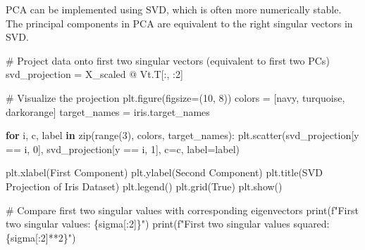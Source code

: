 \documentclass[
  letterpaper,
  DIV=11,
  numbers=noendperiod]{scrreprt}
\newenvironment{Shaded}{\begin{snugshade}}{\end{snugshade}}
\newcommand{\BuiltInTok}[1]{\textcolor[rgb]{0.00,0.23,0.31}{#1}}
\newcommand{\CommentTok}[1]{\textcolor[rgb]{0.37,0.37,0.37}{#1}}
\newcommand{\ControlFlowTok}[1]{\textcolor[rgb]{0.00,0.23,0.31}{\textbf{#1}}}
\newcommand{\DecValTok}[1]{\textcolor[rgb]{0.68,0.00,0.00}{#1}}
\newcommand{\KeywordTok}[1]{\textcolor[rgb]{0.00,0.23,0.31}{\textbf{#1}}}
\newcommand{\NormalTok}[1]{\textcolor[rgb]{0.00,0.23,0.31}{#1}}
\newcommand{\OperatorTok}[1]{\textcolor[rgb]{0.37,0.37,0.37}{#1}}
\newcommand{\SpecialCharTok}[1]{\textcolor[rgb]{0.37,0.37,0.37}{#1}}
\newcommand{\SpecialStringTok}[1]{\textcolor[rgb]{0.13,0.47,0.30}{#1}}
\newcommand{\StringTok}[1]{\textcolor[rgb]{0.13,0.47,0.30}{#1}}
\newcommand{\VariableTok}[1]{\textcolor[rgb]{0.07,0.07,0.07}{#1}}
\begin{document}
PCA can be implemented using SVD, which is often more numerically
stable. The principal components in PCA are equivalent to the right
singular vectors in SVD.

\begin{Shaded}
\begin{Highlighting}[]
\CommentTok{\# Project data onto first two singular vectors (equivalent to first two PCs)}
\NormalTok{svd\_projection }\OperatorTok{=}\NormalTok{ X\_scaled }\OperatorTok{@}\NormalTok{ Vt.T[:, :}\DecValTok{2}\NormalTok{]}

\CommentTok{\# Visualize the projection}
\NormalTok{plt.figure(figsize}\OperatorTok{=}\NormalTok{(}\DecValTok{10}\NormalTok{, }\DecValTok{8}\NormalTok{))}
\NormalTok{colors }\OperatorTok{=}\NormalTok{ [}\StringTok{\textquotesingle{}navy\textquotesingle{}}\NormalTok{, }\StringTok{\textquotesingle{}turquoise\textquotesingle{}}\NormalTok{, }\StringTok{\textquotesingle{}darkorange\textquotesingle{}}\NormalTok{]}
\NormalTok{target\_names }\OperatorTok{=}\NormalTok{ iris.target\_names}

\ControlFlowTok{for}\NormalTok{ i, c, label }\KeywordTok{in} \BuiltInTok{zip}\NormalTok{(}\BuiltInTok{range}\NormalTok{(}\DecValTok{3}\NormalTok{), colors, target\_names):}
\NormalTok{    plt.scatter(svd\_projection[y }\OperatorTok{==}\NormalTok{ i, }\DecValTok{0}\NormalTok{], svd\_projection[y }\OperatorTok{==}\NormalTok{ i, }\DecValTok{1}\NormalTok{], }
\NormalTok{                c}\OperatorTok{=}\NormalTok{c, label}\OperatorTok{=}\NormalTok{label)}
    
\NormalTok{plt.xlabel(}\StringTok{\textquotesingle{}First Component\textquotesingle{}}\NormalTok{)}
\NormalTok{plt.ylabel(}\StringTok{\textquotesingle{}Second Component\textquotesingle{}}\NormalTok{)}
\NormalTok{plt.title(}\StringTok{\textquotesingle{}SVD Projection of Iris Dataset\textquotesingle{}}\NormalTok{)}
\NormalTok{plt.legend()}
\NormalTok{plt.grid(}\VariableTok{True}\NormalTok{)}
\NormalTok{plt.show()}

\CommentTok{\# Compare first two singular values with corresponding eigenvectors}
\BuiltInTok{print}\NormalTok{(}\SpecialStringTok{f"First two singular values: }\SpecialCharTok{\{}\NormalTok{sigma[:}\DecValTok{2}\NormalTok{]}\SpecialCharTok{\}}\SpecialStringTok{"}\NormalTok{)}
\BuiltInTok{print}\NormalTok{(}\SpecialStringTok{f"First two singular values squared: }\SpecialCharTok{\{}\NormalTok{sigma[:}\DecValTok{2}\NormalTok{]}\OperatorTok{**}\DecValTok{2}\SpecialCharTok{\}}\SpecialStringTok{"}\NormalTok{)}
\end{Highlighting}
\end{Shaded}
\end{document}
